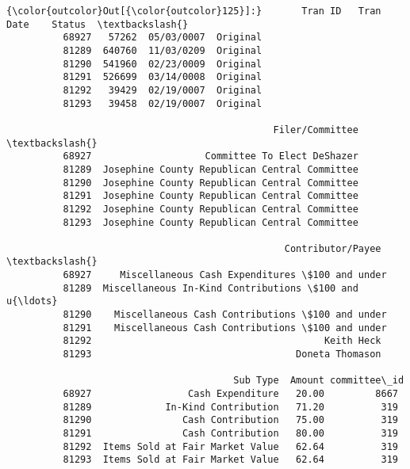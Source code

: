 \documentclass[11pt]{article}
\begin{document}
\begin{Verbatim}[commandchars=\\\{\}]
{\color{outcolor}Out[{\color{outcolor}125}]:}       Tran ID   Tran Date    Status  \textbackslash{}
          68927   57262  05/03/0007  Original   
          81289  640760  11/03/0209  Original   
          81290  541960  02/23/0009  Original   
          81291  526699  03/14/0008  Original   
          81292   39429  02/19/0007  Original   
          81293   39458  02/19/0007  Original   
          
                                               Filer/Committee  \textbackslash{}
          68927                    Committee To Elect DeShazer   
          81289  Josephine County Republican Central Committee   
          81290  Josephine County Republican Central Committee   
          81291  Josephine County Republican Central Committee   
          81292  Josephine County Republican Central Committee   
          81293  Josephine County Republican Central Committee   
          
                                                 Contributor/Payee  \textbackslash{}
          68927     Miscellaneous Cash Expenditures \$100 and under   
          81289  Miscellaneous In-Kind Contributions \$100 and u{\ldots}   
          81290    Miscellaneous Cash Contributions \$100 and under   
          81291    Miscellaneous Cash Contributions \$100 and under   
          81292                                         Keith Heck   
          81293                                    Doneta Thomason   
          
                                        Sub Type  Amount committee\_id  
          68927                 Cash Expenditure   20.00         8667  
          81289             In-Kind Contribution   71.20          319  
          81290                Cash Contribution   75.00          319  
          81291                Cash Contribution   80.00          319  
          81292  Items Sold at Fair Market Value   62.64          319  
          81293  Items Sold at Fair Market Value   62.64          319  
\end{Verbatim}
            

    
    
    
    
\end{document}
